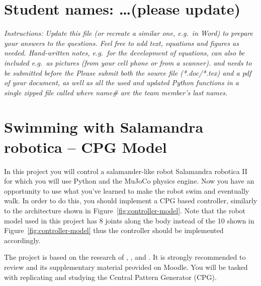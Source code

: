 \documentclass{cmc}
\begin{document}
\pagestyle{fancy}
 

\section*{Student names: \ldots (please update)}

\textit{Instructions: Update this file (or recreate a similar one, e.g.\ in
  Word) to prepare your answers to the questions. Feel free to add text,
  equations and figures as needed. Hand-written notes, e.g.\ for the development
  of equations, can also be included e.g.\ as pictures (from your cell phone or
  from a scanner).  \textbf{} and needs to be
  submitted before the \textbf{} Please submit both the source file (*.doc/*.tex)
  and a pdf of your document, as well as all the used and updated Python
  functions in a single zipped file called
   where name\# are the team
  member’s last names.  }
\\

\section*{Swimming with Salamandra robotica – CPG Model}
\label{sec:exploring-swimming}

In this project you will control a salamander-like robot Salamandra robotica II
for which you will use Python and the MuJoCo physics engine. Now you have an
opportunity to use what you’ve learned to make the robot swim and eventually
walk. In order to do this, you should implement a CPG based controller,
similarly to the architecture shown in Figure~\ref{fig:controller-model}. Note
that the robot model used in this project has 8 joints along the body instead of
the 10 shown in Figure~\ref{fig:controller-model} thus the controller should be
implemented accordingly.

The project is based on the research of \cite{Crespi2013},
\cite{Karakasiliotis2013}, \cite{ijspeert2007swimming} and
\cite{thandiackal2021emergence}. It is strongly recommended to review
\cite{ijspeert2007swimming} and its supplementary material provided on
Moodle. You will be tasked with replicating and studying the Central Pattern
Generator (CPG).
\end{document}
